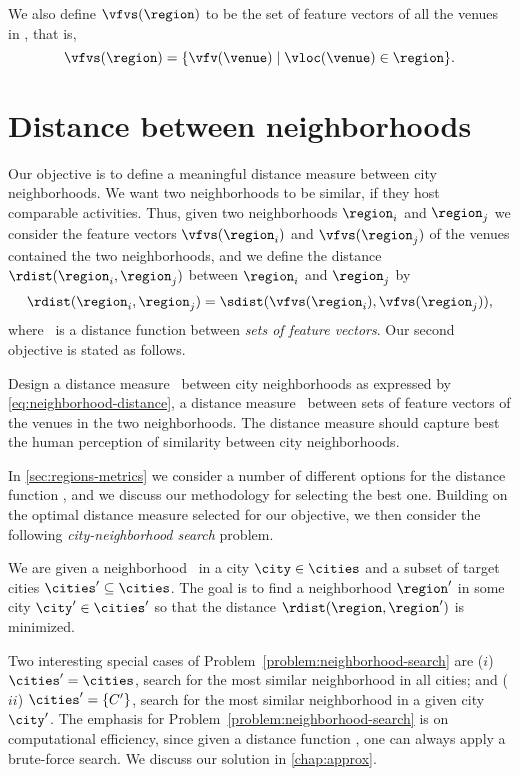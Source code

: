 We also define $\vfvs(\region)$ to be the set of feature vectors of
all the venues in \region, that is, 
\begin{equation*}
 \vfvs(\region) = \{ \vfv(\venue) \mid \vloc(\venue)\in\region \}.  
\end{equation*}


\section{Distance between neighborhoods}
\label{sub:neigh-problem}
Our objective is to define a meaningful distance measure between city
neighborhoods.
We want two neighborhoods to be similar, 
if they host comparable activities.
Thus, given two neighborhoods $\region_i$ and $\region_j$ 
we consider the feature vectors $\vfvs(\region_i)$ and
$\vfvs(\region_j)$ of the venues contained the two neighborhoods, and 
we define the distance $\rdist(\region_i,\region_j)$ between
$\region_i$ and $\region_j$ by
\begin{equation}
\label{eq:neighborhood-distance}
\rdist(\region_i,\region_j) = 
\sdist(\vfvs(\region_i),\vfvs(\region_j)),
\end{equation}
where \sdist\ is a distance function between 
{\em sets of feature vectors}. 
Our second objective is stated as follows.
\begin{objective}
\label{objective:neighborhood-distance-learning}
Design a distance measure \rdist\ between city neighborhoods as
expressed by \eqref{eq:neighborhood-distance},
\ie{} a distance measure \sdist\ between sets of feature vectors  of the
venues in the two neighborhoods. 
The distance measure should capture best the human
perception of similarity between city neighborhoods. 
\end{objective}
In \autoref{sec:regions-metrics}
we consider a number of different options for the distance function
\sdist, and we discuss our methodology for selecting the best one.
Building on the optimal distance measure selected for our objective, 
we then consider the following {\em city-neighborhood search} problem. 

\begin{problem}
\label{problem:neighborhood-search}
We are given a neighborhood \region\ in a city $\city\in\cities$
and a subset of target cities $\cities'\subseteq\cities$.
The goal is to find a neighborhood $\region'$ in some city 
$\city'\in\cities'$ so that the distance
$\rdist(\region,\region')$ is minimized. 
\end{problem}

Two interesting special cases of
Problem~\ref{problem:neighborhood-search} are
($i$)  $\cities'=\cities$, 
search for the most similar neighborhood in all cities; 
and 
($ii$) $\cities'=\{C'\}$, 
search for the most similar neighborhood in a given city $\city'$.
The emphasis for Problem~\ref{problem:neighborhood-search} is on computational
efficiency, since given a distance function \rdist{}, one can always apply a
brute-force search.  We discuss our solution in \autoref{chap:approx}.
